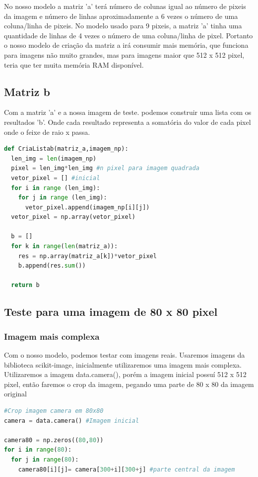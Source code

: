 \documentclass[a4paper, 12pt]{article}
\begin{document}
No nosso modelo a matriz 'a' terá número de colunas igual ao número de pixeis da imagem e número de linhas aproximadamente a 6 vezes o número de uma coluna/linha de pixeis. No modelo usado para 9 pixeis, a matriz 'a' tinha uma quantidade de linhas de 4 vezes o número de uma coluna/linha de pixel. Portanto o nosso modelo de criação da matriz a irá consumir mais memória, que funciona para imagens não muito grandes, mas para imagens maior que 512 x 512 pixel, teria que ter muita memória RAM disponível.

\subsection{Matriz b}

Com a matriz 'a' e a nossa imagem de teste. podemos construir uma lista com os resultados 'b'. Onde cada resultado representa a somatória do valor de cada pixel onde o feixe de raio x passa.

\begin{lstlisting}[language=Python, caption=Matriz b, label=Matriz b]
def CriaListab(matriz_a,imagem_np):
  len_img = len(imagem_np)
  pixel = len_img*len_img #n pixel para imagem quadrada
  vetor_pixel = [] #inicial
  for i in range (len_img):
    for j in range (len_img):
      vetor_pixel.append(imagem_np[i][j])
  vetor_pixel = np.array(vetor_pixel)

  b = []
  for k in range(len(matriz_a)):
    res = np.array(matriz_a[k])*vetor_pixel
    b.append(res.sum())

  return b
\end{lstlisting}

\subsection{Teste para uma imagem de 80 x 80 pixel}

\subsubsection{Imagem mais complexa}

Com o nosso modelo, podemos testar com imagens reais. Usaremos imagens da biblioteca scikit-image, inicialmente utilizaremos uma imagem mais complexa. Utilizaremos a imagem data.camera(), porém a imagem inicial possuí 512 x 512 pixel, então faremos o crop da imagem, pegando uma parte de 80 x 80 da imagem original

\begin{lstlisting}[language=Python, caption=Corte de imagem, label=camera80]
#Crop imagem camera em 80x80
camera = data.camera() #Imagem inicial

camera80 = np.zeros((80,80))
for i in range(80):
  for j in range(80):
    camera80[i][j]= camera[300+i][300+j] #parte central da imagem
\end{lstlisting}
\end{document}

